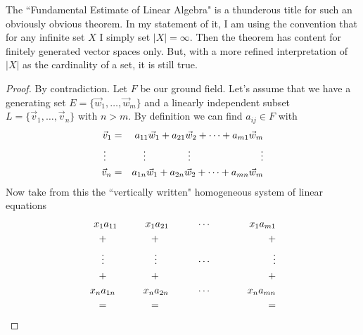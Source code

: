 \documentclass[11pt]{amsbook}
\theoremstyle{definition}
\begin{document}
The ``Fundamental Estimate of Linear Algebra" is a thunderous title for such an obviously obvious theorem. In my statement of it, I am using the convention that for any infinite set $X$ I simply set $|X| = \infty$. Then the theorem has content for finitely generated vector spaces only. But, with a more refined interpretation of $|X|$ as the cardinality of a set, it is still true.

\begin{proof} By contradiction. Let $F$ be our ground field. Let's assume that we have a generating set $E = \{ \vec{w}_1, \ldots , \vec{w}_m\}$ and a linearly independent subset $L = \{ \vec{v}_1, \ldots , \vec{v}_n\}$ with $n>m$.  By definition we can find $a_{ij} \in F$ with
\begin{eqnarray*}
\vec{v}_1 & = &  a_{11}\vec{w}_1 +  a_{21}\vec{w}_2 + \cdots +  a_{m1} \vec{w}_m \\
\vdots \hspace{0.2cm} &  & \hspace{0.3cm} \vdots \hspace{1.5cm} \vdots \hspace{2.5cm} \vdots  \\
\vec{v}_n & = &  a_{1n}\vec{w}_1 +  a_{2n}\vec{w}_2 + \cdots +  a_{mn} \vec{w}_m
\end{eqnarray*}
Now take from this the ``vertically written" homogeneous system of linear equations
\begin{eqnarray*}
x_1a_{11} \hspace{1cm} x_1a_{21} & \hspace{1cm} \cdots & \hspace{1cm} x_1a_{m1} \\
 + \hspace{1.6cm} + \quad &  & \hspace{1.2cm} + \\
\vdots \hspace{1.8cm}  \vdots \quad \, & \hspace{1cm} \cdots &\hspace{1.3cm} \vdots \\
+  \hspace{1.6cm} + \quad  & & \hspace{1.2cm} + \\
x_na_{1n} \hspace{1cm}  x_na_{2n} & \hspace{1cm} \cdots & \hspace{1cm} x_na_{mn} \\
= \hspace{1.6cm} = \quad & &\hspace{1.2cm} = \\

\end{eqnarray*}
\end{proof}
\end{document}
